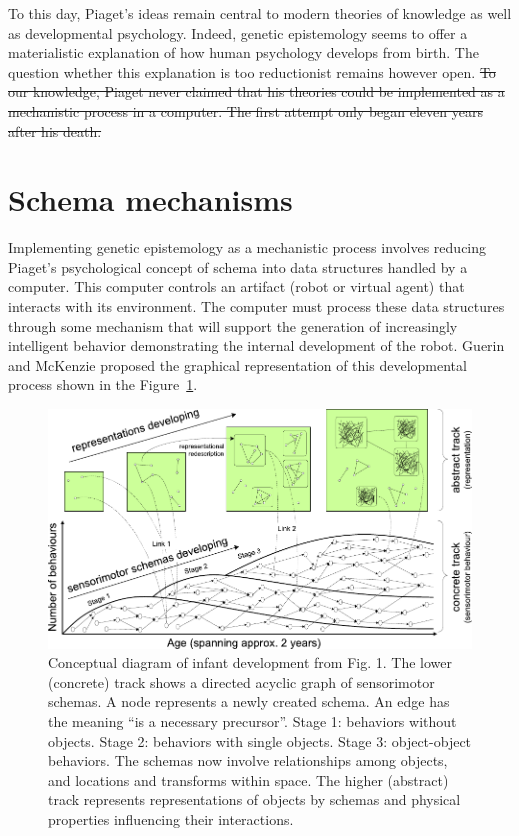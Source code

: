 \documentclass[runningheads]{llncs}
\begin{document}
To this day, Piaget's ideas remain central to modern theories of knowledge as well as developmental psychology. 
Indeed, genetic epistemology seems to offer a materialistic explanation of how human psychology develops from birth.
The question whether this explanation is too reductionist remains however open.
\sout{To our knowledge, Piaget never claimed that his theories could be implemented as a mechanistic process in a computer. 
The first attempt only began eleven years after his death.}



%
\section{Schema mechanisms}
\label{sec:schema}
%
Implementing genetic epistemology as a mechanistic process involves reducing Piaget's psychological concept of schema into data structures handled by a computer. 
This computer controls an artifact (robot or virtual agent) that interacts with its environment.
The computer must process these data structures through some mechanism that will support the generation of increasingly intelligent behavior demonstrating the internal development of the robot.
Guerin and McKenzie \cite{guerin_survey_2013} proposed the graphical representation of this developmental process shown in the Figure~\ref{fig:general}.
%
\begin{figure}
	\includegraphics[width=\textwidth]{Figure_1_guerin.pdf}
	\caption{Conceptual diagram of infant development from \cite{guerin_survey_2013} Fig. 1.
	The lower (concrete) track shows a directed acyclic graph of sensorimotor schemas. 
	A node represents a newly created schema. 
	An edge has the meaning ``is a necessary precursor''. 
    Stage 1: behaviors without objects. 
    Stage 2: behaviors with single objects. 
    Stage 3: object-object behaviors. The schemas now involve relationships among objects, and locations and transforms within space.
    The higher (abstract) track represents representations of objects by schemas and physical properties influencing their interactions.} 
	\label{fig:general}
\end{figure}
\end{document}
